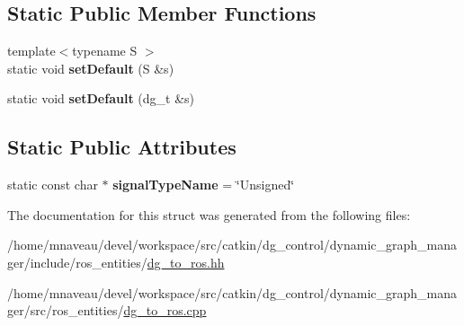 \subsection*{Static Public Member Functions}
\begin{DoxyCompactItemize}
\item 
{\footnotesize template$<$typename S $>$ }\\static void {\bfseries set\+Default} (S \&s)\hypertarget{structdynamic__graph_1_1DgToRos_3_01unsigned_01int_01_4_abfb90bc3d058b0fa0fbdf330f9f5d1a2}{}\label{structdynamic__graph_1_1DgToRos_3_01unsigned_01int_01_4_abfb90bc3d058b0fa0fbdf330f9f5d1a2}

\item 
static void {\bfseries set\+Default} (dg\+\_\+t \&s)\hypertarget{structdynamic__graph_1_1DgToRos_3_01unsigned_01int_01_4_a66d4d5c633e9930bd93ac4dff834df35}{}\label{structdynamic__graph_1_1DgToRos_3_01unsigned_01int_01_4_a66d4d5c633e9930bd93ac4dff834df35}

\end{DoxyCompactItemize}
\subsection*{Static Public Attributes}
\begin{DoxyCompactItemize}
\item 
static const char $\ast$ {\bfseries signal\+Type\+Name} = \char`\"{}Unsigned\char`\"{}\hypertarget{structdynamic__graph_1_1DgToRos_3_01unsigned_01int_01_4_a90b168f7b37e418e8c5ad1825c5abb36}{}\label{structdynamic__graph_1_1DgToRos_3_01unsigned_01int_01_4_a90b168f7b37e418e8c5ad1825c5abb36}

\end{DoxyCompactItemize}


The documentation for this struct was generated from the following files\+:\begin{DoxyCompactItemize}
\item 
/home/mnaveau/devel/workspace/src/catkin/dg\+\_\+control/dynamic\+\_\+graph\+\_\+manager/include/ros\+\_\+entities/\hyperlink{dg__to__ros_8hh}{dg\+\_\+to\+\_\+ros.\+hh}\item 
/home/mnaveau/devel/workspace/src/catkin/dg\+\_\+control/dynamic\+\_\+graph\+\_\+manager/src/ros\+\_\+entities/\hyperlink{dg__to__ros_8cpp}{dg\+\_\+to\+\_\+ros.\+cpp}\end{DoxyCompactItemize}
